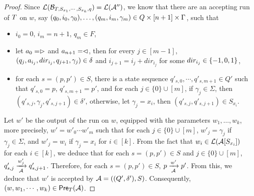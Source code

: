 \begin{proof}
Since $\mathcal{L}(\mathcal{B}_{T, S_{x_1}, \cdots, S_{x_k}, q})=\mathcal{L}(\mathcal{A}'')$, we know that  there are an accepting run of $T$ on $w$, 
say $(q_0, i_0, \gamma_0),\ldots, (q_m, i_m, \gamma_m) \in Q \times [n+1] \times \Gamma$, such that 
\begin{itemize}
\item $i_0=0$, $i_m = n+1$, $q_m \in F$, 
%
\item let $a_0 = \vartriangleright$ and $a_{n+1} = \vartriangleleft$,  then for every $j \in [m-1]$, $(q_j, a_{i_j}, dir_{i_j}, q_{j+1}, \gamma_j) \in
        \delta$ and $i_{j+1} = i_j + dir_{i_j}$ for some $dir_{i_j} \in \{-1, 0, 1\}$, 
 \item  for each $s=(p, p') \in S$, there is a state sequence $q'_{s, 0}, \cdots, q'_{s,m+1} \in Q'$ such that $q'_{s,0}= p$, $q'_{s, m+1} = p'$, and 
 for each $j \in \{0\} \cup [m]$, if $\gamma_j \in \Sigma$, then $(q'_{s, j}, \gamma_j, q'_{s, j+1}) \in \delta'$, otherwise, let $\gamma_j =x_i$, then $(q'_{s, j}, q'_{s, j+1}) \in S_{x_i}$.  
\end{itemize}
Let $w'$ be the output of the run on $w$, equipped with the parameters $w_1,\ldots, w_k$, more precisely, $w' = w'_0 \cdots w'_m$ such that for each $j \in \{0\} \cup [m]$, $w'_j = \gamma_j$ if $\gamma_j \in \Sigma$, and $w'_j = w_i$ if $\gamma_j = x_i$ for $i \in [k]$. From the fact that $w_i \in \mathcal{L}(\mathcal{A}[S_{x_i}])$ for each $i \in [k]$, we deduce that for each $s = (p,p') \in S$ and $j \in \{0\} \cup [m]$, $q'_{s, j} \xrightarrow[\mathcal{A}]{w'_j} q'_{s, j+1}$.
Therefore, for each $s = (p,p') \in S$, $p \xrightarrow[\mathcal{A}]{w'} p'$. From this, we deduce that $w'$ is accepted by $\mathcal{A}=((Q', \delta'), S)$.
Consequently, $(w, w_1,\cdots, w_k) \in \textsf{Pre}_{T}(\mathcal{A})$.
\end{proof}